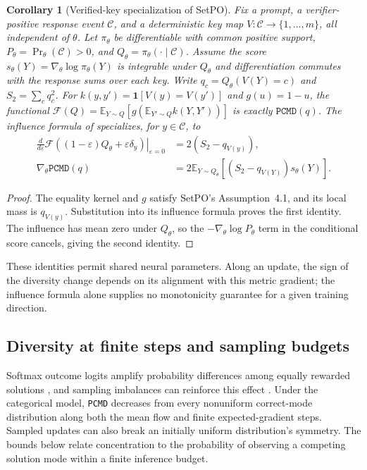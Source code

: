 \documentclass{article}
\newcommand{\enforcehalffinalproseline}{%
  \setlength{\parfillskip}{0pt plus .20\linewidth}}
\newcommand{\1}{\mathbf 1}
\newcommand{\E}{\mathbb E}
\newcommand{\pmd}{\texttt{PCMD}}
\newtheorem{corollary}[lemma]{Corollary}
\theoremstyle{remark}
\theoremstyle{definition}
\theoremstyle{plain}
\begin{document}
\begin{corollary}[Verified-key specialization of SetPO]
\enforcehalffinalproseline
\label{cor:pcmd-setpo-neural}
Fix a prompt, a verifier-positive response event $\mathcal C$, and a
deterministic key map $V:\mathcal C\to\{1,\ldots,m\}$, all independent
of $\theta$. Let $\pi_\theta$ be differentiable with common positive support,
$P_\theta=\Pr_\theta(\mathcal C)>0$, and
$Q_\theta=\pi_\theta(\cdot\mid\mathcal C)$. Assume the score
$s_\theta(Y)=\nabla_\theta\log\pi_\theta(Y)$ is integrable under $Q_\theta$
and differentiation commutes with the response sums over each key.
Write $q_c=Q_\theta(V(Y)=c)$ and $S_2=\sum_cq_c^2$.
For $k(y,y')=\1[V(y)=V(y')]$ and $g(u)=1-u$, the functional
$\mathcal F(Q)=\E_{Y\sim Q}[g(\E_{Y'\sim Q}k(Y,Y'))]$ is exactly
$\pmd(q)$. The influence formula of
\citet[Theorem~4.2, v1]{li2026setpo} specializes, for $y\in\mathcal C$, to
\begin{align}
 \left.\frac{d}{d\varepsilon}
  \mathcal F((1-\varepsilon)Q_\theta+\varepsilon\delta_y)
  \right|_{\varepsilon=0}
 &=2(S_2-q_{V(y)}),\label{eq:pcmd-setpo-influence}\\
 \nabla_\theta\pmd(q)
 &=2\E_{Y\sim Q_\theta}
       [(S_2-q_{V(Y)})s_\theta(Y)].
 \label{eq:pcmd-neural-gradient}
\end{align}
\end{corollary}
\begin{proof}
\enforcehalffinalproseline
The equality kernel and $g$ satisfy SetPO's Assumption~4.1, and its local
mass is $q_{V(y)}$. Substitution into its influence formula proves the first
identity. The influence has mean zero under $Q_\theta$, so the
$-\nabla_\theta\log P_\theta$ term in the conditional score cancels,
giving the second identity.
\end{proof}
These identities permit shared neural parameters. Along an update, the
sign of the diversity change depends on its alignment with this metric
gradient; the influence formula alone supplies no monotonicity guarantee
for a given training direction.

\subsection{Diversity at finite steps and sampling budgets}
\label{app:finite-time-diversity}

Softmax outcome logits amplify probability differences among equally rewarded
solutions \citep[Theorem~3.1 and App.~A.1]{sinha2026expected}, and
sampling imbalances can reinforce this effect
\citep[Section~4.2]{lochab2026ucpo}. Under the categorical model,
\pmd{} decreases from every nonuniform correct-mode distribution along
both the mean flow and finite expected-gradient steps. Sampled updates can
also break an initially uniform distribution's symmetry. The bounds below
relate concentration to the probability of observing a competing solution
mode within a finite inference budget.
\end{document}
